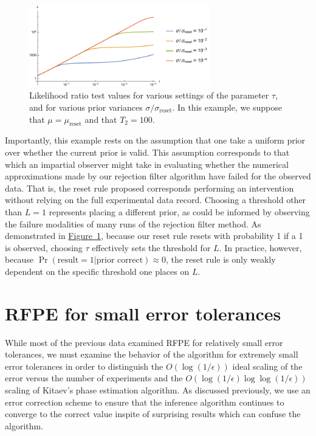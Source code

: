 \documentclass[aps,pra,amsmath,twocolumn,amssymb,superscriptaddress]{revtex4-1}
\newcommand{\reset}{\mathrm{reset}}
\newcommand{\fig}[1]{\hyperref[fig:#1]{Figure~\ref*{fig:#1}}}
\begin{document}
{\begin{figure}
    \begin{center}
        \includegraphics[width=0.7\textwidth]{reset-bf-thresholds.pdf}
    \end{center}
    \caption{
        \label{fig:reset-bf-thresholds}
        Likelihood ratio test values for various settings of the parameter
        $\tau$, and for various prior variances $\sigma / \sigma_\reset$.
        In this example, we suppose that $\mu = \mu_\reset$ and that $T_2 = 100$.
    }
\end{figure}

Importantly, this example rests on the assumption that one take a uniform
prior over whether the current prior is valid. This assumption corresponds to
that which an impartial observer might take in evaluating whether the numerical
approximations made by our rejection filter algorithm have failed for the
observed data. That is, the reset rule proposed corresponds performing an intervention
without relying on the full experimental data record. Choosing a threshold
other than $L = 1$ represents placing a different prior, as could be informed by observing
the failure modalities of many runs of the rejection filter method. As
demonstrated in \fig{reset-bf-thresholds}, because our reset rule resets with
probability 1 if a 1 is observed, choosing $\tau$ effectively sets the threshold
for $L$.
In practice,
however, because $\Pr(\text{result} = 1 | \text{prior correct}) \approx 0$, the reset
rule is only weakly dependent on the specific threshold one places on $L$.

\section{RFPE for small error tolerances}
While most of the previous data examined RFPE for relatively small error tolerances, we must examine the behavior of the algorithm for extremely
small error tolerances in order to distinguish the $O(\log(1/\epsilon))$ ideal scaling of the error versus the number of experiments and the
$O(\log(1/\epsilon)\log\log(1/\epsilon))$ scaling of Kitaev's phase estimation algorithm.  As discussed previously, we use an error correction scheme
to ensure that the inference algorithm continues to converge to the correct value inspite of surprising results which can confuse the algorithm.

}
\end{document}
